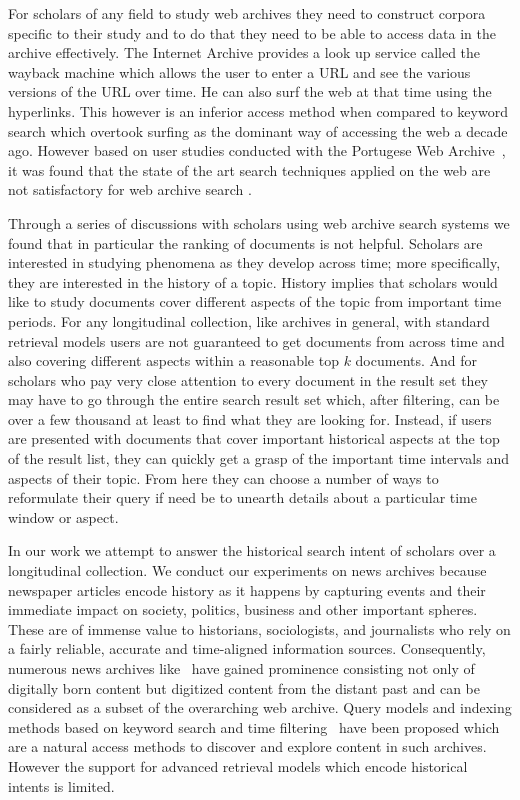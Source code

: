 For scholars of any field to study web archives they need to construct corpora specific to their study \cite{palmer2008scholarship} and to do that they need to be able to access data in the archive effectively. The Internet Archive provides a look up service called the wayback machine\cite{wayback} which allows the user to enter a URL and see the various versions of the URL over time. He can also surf the web at that time using the hyperlinks. This however is an inferior access method when compared to keyword search which overtook surfing as the dominant way of accessing the web a decade ago. However based on user studies conducted with the Portugese Web Archive~\cite{pta}, it was found that the state of the art search techniques applied on the web are not satisfactory for web archive search \cite{costa2010understanding}. 

Through a series of discussions with scholars using web archive search systems we found that in particular the ranking of documents is not helpful. Scholars are interested in studying phenomena as they develop across time; more specifically, they are interested in the history of a topic. History implies that scholars would like to study documents cover different aspects of the topic from important time periods. For any longitudinal collection, like archives in general, with standard retrieval models users are not guaranteed to get documents from across time and also covering different aspects within a reasonable top $k$ documents. And for scholars who pay very close attention to every document in the result set they may have to go through the entire search result set which, after filtering, can be over a few thousand at least to find what they are looking for. Instead, if users are presented with documents that cover important historical aspects at the top of the result list, they can quickly get a grasp of the important time intervals and aspects of their topic. From here they can choose a number of ways to reformulate their query if need be to unearth details about a particular time window or aspect.

In our work we attempt to answer the historical search intent of scholars over a longitudinal collection. We conduct our experiments on news archives because newspaper articles encode history as it happens by capturing events and their immediate impact on society, politics, business and other important spheres. These are of immense value to historians, sociologists, and journalists who rely on a fairly reliable, accurate and time-aligned information sources. Consequently, numerous news archives like~\cite{nytarchive,caliarchive,ukarchive} have gained prominence consisting not only of digitally born content but digitized content from the distant past and can be considered as a subset of the overarching web archive. Query models and indexing methods based on keyword search and time filtering~\cite{berberich_time_2007,anand_2012_index} have been proposed which are a natural access methods to discover and explore content in such archives. However the support for advanced retrieval models which encode historical intents is limited. 

